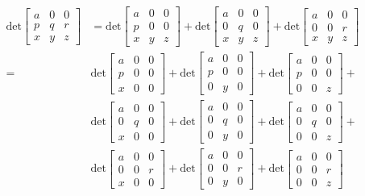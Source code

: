 \documentclass{report}
\begin{document}
\begin{align*}
\text{det}\left[\begin{array}{ccc}
a&0&0\\
p&q&r\\
x&y&z
\end{array}\right]&=
\text{det}\left[\begin{array}{ccc}
a&0&0\\
p&0&0\\
x&y&z
\end{array}\right]+
\text{det}\left[\begin{array}{ccc}
a&0&0\\
0&q&0\\
x&y&z
\end{array}\right]+
\text{det}\left[\begin{array}{ccc}
a&0&0\\
0&0&r\\
x&y&z
\end{array}\right]\\
=\,&\text{det}\left[\begin{array}{ccc}
a&0&0\\
p&0&0\\
x&0&0
\end{array}\right]+
\text{det}\left[\begin{array}{ccc}
a&0&0\\
p&0&0\\
0&y&0
\end{array}\right]+
\text{det}\left[\begin{array}{ccc}
a&0&0\\
p&0&0\\
0&0&z
\end{array}\right]+\\
&\text{det}\left[\begin{array}{ccc}
a&0&0\\
0&q&0\\
x&0&0
\end{array}\right]+
\text{det}\left[\begin{array}{ccc}
a&0&0\\
0&q&0\\
0&y&0
\end{array}\right]+
\text{det}\left[\begin{array}{ccc}
a&0&0\\
0&q&0\\
0&0&z
\end{array}\right]+\\
&\text{det}\left[\begin{array}{ccc}
a&0&0\\
0&0&r\\
x&0&0
\end{array}\right]+
\text{det}\left[\begin{array}{ccc}
a&0&0\\
0&0&r\\
0&y&0
\end{array}\right]+
\text{det}\left[\begin{array}{ccc}
a&0&0\\
0&0&r\\
0&0&z
\end{array}\right]
\end{align*}
\end{document}
